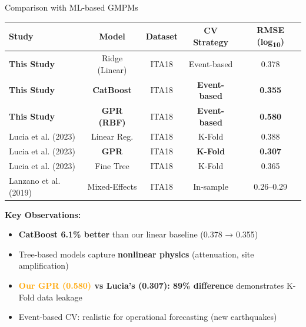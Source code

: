\documentclass[aspectratio=169,11pt]{beamer}
\begin{document}
\begin{frame}{Comparison with ML-based GMPMs}
\begin{table}
\centering
\small
\begin{tabular}{@{}lcccc@{}}
\toprule
\textbf{Study} & \textbf{Model} & \textbf{Dataset} & \textbf{CV Strategy} & \textbf{RMSE (log\textsubscript{10})} \\
\midrule
\rowcolor{lightgray!20}
\textbf{This Study} & Ridge (Linear) & ITA18 & Event-based & 0.378 \\
\rowcolor{successgreen!30}
\textbf{This Study} & \textbf{CatBoost} & ITA18 & \textbf{Event-based} & \textbf{\textcolor{successgreen}{0.355}} \\
\rowcolor{orange!20}
\textbf{This Study} & \textbf{GPR (RBF)} & ITA18 & \textbf{Event-based} & \textbf{0.580} \\
\midrule
Lucia et al. (2023) & Linear Reg. & ITA18 & K-Fold & 0.388 \\
\rowcolor{alertred!15}
Lucia et al. (2023) & \textbf{GPR} & ITA18 & \textcolor{alertred}{\textbf{K-Fold}} & \textbf{\textcolor{alertred}{0.307}} \\
Lucia et al. (2023) & Fine Tree & ITA18 & K-Fold & 0.365 \\
Lanzano et al. (2019) & Mixed-Effects & ITA18 & In-sample & 0.26--0.29 \\
\bottomrule
\end{tabular}
\end{table}

\vspace{0.1cm}
\textbf{Key Observations:}
\begin{itemize}
    \item \textbf{\textcolor{successgreen}{CatBoost 6.1\% better}} than our linear baseline (0.378 → 0.355)
    \item Tree-based models capture \textbf{nonlinear physics} (attenuation, site amplification)
    \item \textbf{\textcolor{orange}{Our GPR (0.580)} vs \textcolor{alertred}{Lucia's (0.307)}: 89\% difference} demonstrates K-Fold data leakage
    \item Event-based CV: realistic for operational forecasting (new earthquakes)
\end{itemize}
\end{frame}
\end{document}

